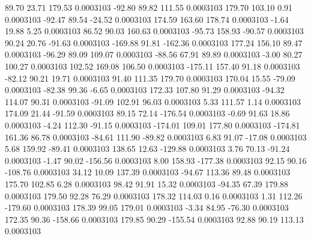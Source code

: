        89.70       23.71      179.53     0.0003103
      -92.80       89.82      111.55     0.0003103
      179.70      103.10        0.91     0.0003103
      -92.47       89.54      -24.52     0.0003103
      174.59      163.60      178.74     0.0003103
       -1.64       19.88        5.25     0.0003103
       86.52       90.03      160.63     0.0003103
      -95.73      158.93      -90.57     0.0003103
       90.24       20.76      -91.63     0.0003103
     -169.88       91.81     -162.36     0.0003103
      177.24      156.10       89.47     0.0003103
      -96.29       89.09      109.07     0.0003103
      -88.56       67.91       89.89     0.0003103
       -3.00       80.27      100.27     0.0003103
      102.52      169.08      106.50     0.0003103
     -175.11      157.40       91.18     0.0003103
      -82.12       90.21       19.71     0.0003103
       91.40      111.35      179.70     0.0003103
      170.04       15.55      -79.09     0.0003103
      -82.38       99.36       -6.65     0.0003103
      172.33      107.80       91.29     0.0003103
      -94.32      114.07       90.31     0.0003103
      -91.09      102.91       96.03     0.0003103
        5.33      111.57        1.14     0.0003103
      174.09       21.44      -91.59     0.0003103
       89.15       72.14     -176.54     0.0003103
       -0.69       91.63       18.86     0.0003103
       -4.24      112.30      -91.15     0.0003103
     -174.01      109.01      177.80     0.0003103
     -174.81      161.36       86.78     0.0003103
      -84.61      111.90      -89.82     0.0003103
        6.83       91.07      -17.08     0.0003103
        5.68      159.92      -89.41     0.0003103
      138.65       12.63     -129.88     0.0003103
        3.76       70.13      -91.24     0.0003103
       -1.47       90.02     -156.56     0.0003103
        8.00      158.93     -177.38     0.0003103
       92.15       90.16     -108.76     0.0003103
       34.12       10.09      137.39     0.0003103
      -94.67      113.36       89.48     0.0003103
      175.70      102.85        6.28     0.0003103
       98.42       91.91       15.32     0.0003103
      -94.35       67.39      179.88     0.0003103
      179.50       92.28       76.29     0.0003103
      178.32      114.03        0.16     0.0003103
        1.31      112.26     -179.60     0.0003103
      178.39       99.05      179.01     0.0003103
       -3.34       84.95      -76.30     0.0003103
      172.35       90.36     -158.66     0.0003103
      179.85       90.29     -155.54     0.0003103
       92.88       90.19      113.13     0.0003103
